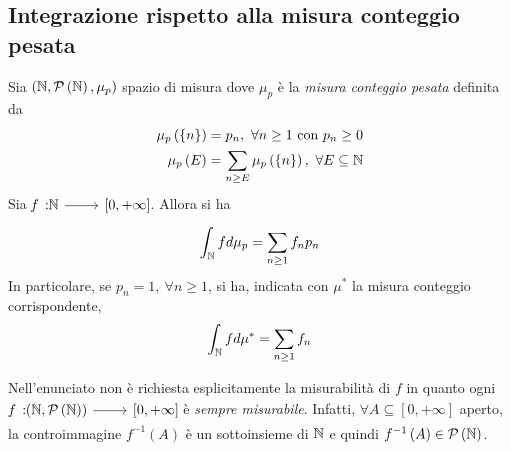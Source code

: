 \subsection{Integrazione rispetto alla misura conteggio pesata}
\begin{theorema}\label{integrazionemisuraconteggiopesata}
	Sia $\left(\mathbb{N},\mathcal{P}\left(\mathbb{N}\right),\mu_p\right)$ spazio di misura dove $\mu_p$ è la \textit{misura conteggio pesata} definita da
	\begin{align*}
		\mu_p\left(\left\{n\right\}\right)=p_n,\ \forall n\geq 1\text{ con }p_n\geq 0\\
		\mu_p\left(E\right)=\sum_{n\geq E}\mu_p\left(\left\{n\right\}\right),\ \forall E\subseteq \mathbb{N}
	\end{align*}
Sia $\funz{f}{\naturalset}{\left[0,+\infty\right]}$. Allora si ha
\begin{equation*}
	\int_{\mathbb{N}}fd\mu_p=\sum_{n\geq 1}f_np_n
\end{equation*}
In particolare, se $p_n=1,\ \forall n\geq 1$, si ha, indicata con $\mu^{\ast}$ la misura conteggio corrispondente,
\begin{equation*}
	\int_{\mathbb{N}}fd\mu^{\ast}=\sum_{n\geq 1}f_n
\end{equation*}
\end{theorema}
\begin{observe}
	Nell'enunciato non è richiesta esplicitamente la misurabilità di $f$ in quanto ogni $\funz{f}{\left(\naturalset,\setpart{\naturalset}\right)}{\left[0,+\infty\right]}$ è \textit{sempre misurabile}. Infatti, $\forall A\subseteq \left[0,+\infty\right]$ aperto, la controimmagine $f^{-1}\left(A\right)$ è un sottoinsieme di $\mathbb{N}$ e quindi $f^{-1}\left(A\right)\in \mathcal{P}\left(\mathbb{N}\right)$.
\end{observe}
